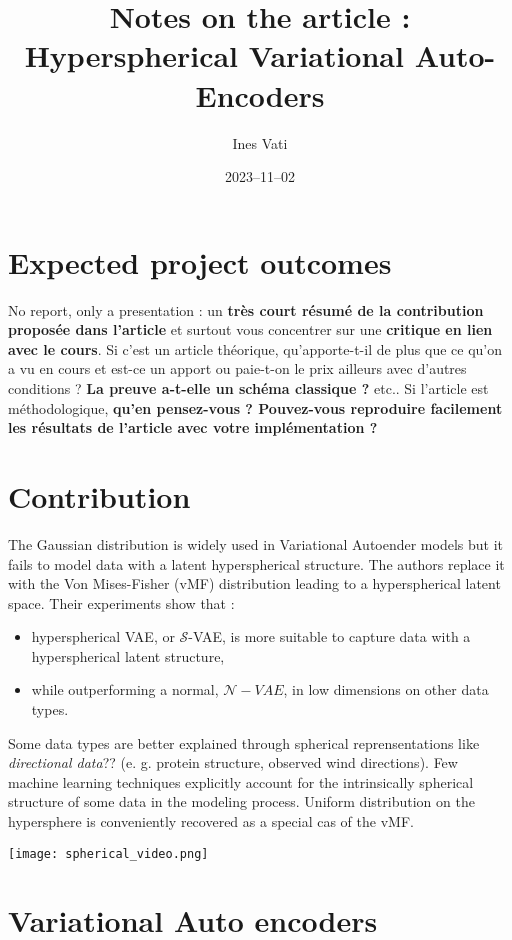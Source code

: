 \documentclass[12pt]{article}
\title{Notes on the article : Hyperspherical Variational Auto-Encoders}
\author{Ines Vati}
\date{2023–11–02}
\begin{document}
\maketitle

\section{Expected project outcomes}
No report, only a presentation :
un \textbf{très court résumé de la contribution proposée dans l'article} et surtout vous concentrer sur une \textbf{critique en lien avec le cours}.
Si c'est un article théorique, qu'apporte-t-il de plus que ce qu'on a vu en cours et est-ce un apport ou paie-t-on le prix ailleurs avec d'autres conditions ? \textbf{La preuve a-t-elle un schéma classique ?} etc..
Si l'article est méthodologique, \textbf{qu'en pensez-vous ? Pouvez-vous reproduire facilement les résultats de l'article avec votre implémentation ?}

\section{Contribution}
The Gaussian distribution is widely used in Variational Autoender models but it fails to model data with a latent hyperspherical structure. The authors replace it with the Von Mises-Fisher (vMF) distribution leading to a hyperspherical latent space.
Their experiments show that :
\begin{itemize}
    \item hyperspherical VAE, or $\mathcal{S}$-VAE, is more suitable to capture data with a hyperspherical latent structure,
    \item while outperforming a normal, $\mathcal{N}-VAE$, in low dimensions on other data types.
\end{itemize}

Some data types are better explained through spherical reprensentations like \textit{directional data}?? (e. g. protein structure, observed wind directions). Few machine learning techniques explicitly account for the intrinsically spherical structure of some data in the modeling process.
Uniform distribution on the hypersphere is conveniently recovered as a special cas of the vMF.

\texttt{[image: spherical\_video.png]}

\section{Variational Auto encoders}
\end{document}
